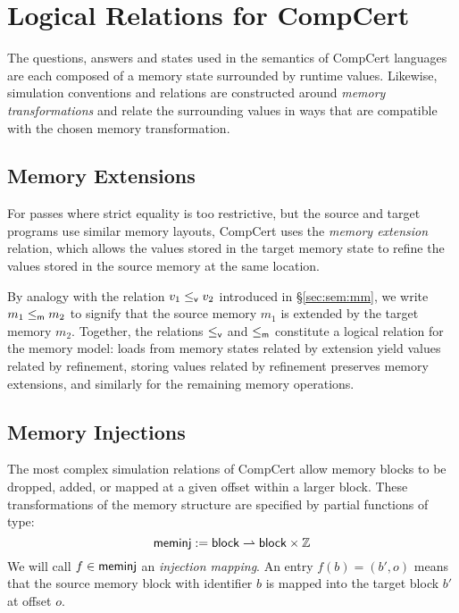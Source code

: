 \documentclass[sigplan,screen]{acmart}
\begin{document}


\section{Logical Relations for CompCert} \label{sec:cklr} %

The questions, answers and states
used in the semantics of CompCert languages are each composed of
a memory state surrounded by runtime values.
Likewise, simulation conventions and relations
are constructed around \emph{memory transformations}
and relate the surrounding values in ways that
are compatible with the chosen memory transformation.

\subsection{Memory Extensions} \label{sec:memext} %

For passes where strict equality is too restrictive,
but the source and target programs
use similar memory layouts,
CompCert uses the \emph{memory extension} relation,
which allows the values
stored in the target memory state to refine
the values stored in the source memory at the same location.

By analogy with
the relation $v_1 \le_{ \mathsf{v} } v_2$
introduced in
\S\ref{sec:sem:mm},
we write $m_1 \le_{ \mathsf{m} } m_2$ to signify that
the source memory $m_1$ is extended by
the target memory $m_2$.
Together,
the relations $\le_{ \mathsf{v} }$ and $\le_{ \mathsf{m} }$
constitute a logical relation for the memory model:
loads from memory states related by extension
yield values related by refinement,
storing values related by refinement
preserves memory extensions,
and similarly for the remaining memory operations.


\subsection{Memory Injections} \label{sec:meminj} %

The most complex simulation relations of CompCert
allow memory blocks to be dropped, added, or
mapped at a given offset within a larger block.
These transformations of the memory structure
are specified by partial functions of type:
\[
   \mathsf{meminj}  :=  \mathsf{block}  \rightharpoonup  \mathsf{block}  \times \mathbb{Z}
\]
We will call $f \in  \mathsf{meminj} $
an \emph{injection mapping}.
An entry $f(b) = (b', o)$
means that the source memory block with identifier $b$
is mapped into the target block $b'$
at offset $o$.
\end{document}
